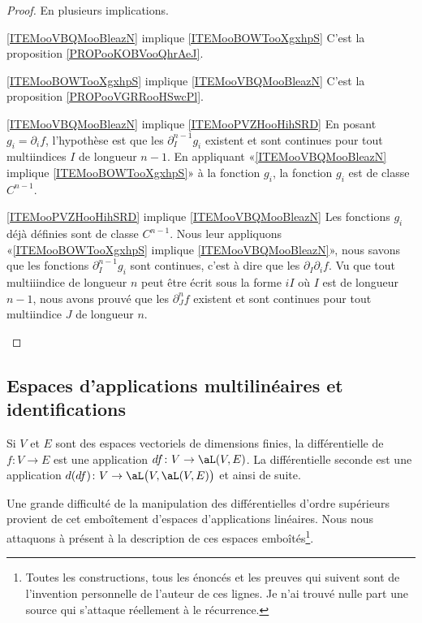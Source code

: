 \begin{proof}
    En plusieurs implications.
    \begin{subproof}
        \item[\ref{ITEMooVBQMooBleazN} implique \ref{ITEMooBOWTooXgxhpS}]
            C'est la proposition \ref{PROPooKOBVooQhrAeJ}.
        \item[\ref{ITEMooBOWTooXgxhpS} implique \ref{ITEMooVBQMooBleazN}]
            C'est la proposition \ref{PROPooVGRRooHSwcPl}.
        \item[\ref{ITEMooVBQMooBleazN} implique \ref{ITEMooPVZHooHihSRD}]
            En posant \( g_i=\partial_if\), l'hypothèse est que les \( \partial^{n-1}_Ig_i\) existent et sont continues pour tout multiindices \( I\) de longueur \( n-1\). En appliquant «\ref{ITEMooVBQMooBleazN} implique \ref{ITEMooBOWTooXgxhpS}» à la fonction \( g_i\), la fonction \( g_i\) est de classe \( C^{n-1}\).
        \item[\ref{ITEMooPVZHooHihSRD} implique \ref{ITEMooVBQMooBleazN}]
            Les fonctions \( g_i\) déjà définies sont de classe \( C^{n-1}\). Nous leur appliquons «\ref{ITEMooBOWTooXgxhpS} implique \ref{ITEMooVBQMooBleazN}», nous savons que les fonctions \( \partial^{n-1}_Ig_i\) sont continues, c'est à dire que les \( \partial_I\partial_if\). Vu que tout multiiindice de longueur \( n\) peut être écrit sous la forme \( iI\) où \( I\) est de longueur \( n-1\), nous avons prouvé que les \( \partial^n_Jf\) existent et sont continues pour tout multiindice \( J\) de longueur \( n\).
    \end{subproof}
\end{proof}

\subsection{Espaces d'applications multilinéaires et identifications}

Si \( V\) et \( E\) sont des espaces vectoriels de dimensions finies, la différentielle de \( f\colon V\to E\) est une application \( df\colon V\to \aL(V,E)\). La différentielle seconde est une application \( d(df)\colon V\to \aL\big( V,\aL(V,E) \big)\) et ainsi de suite.

Une grande difficulté de la manipulation des différentielles d'ordre supérieurs provient de cet emboîtement d'espaces d'applications linéaires. Nous nous attaquons à présent à la description de ces espaces emboîtés\footnote{Toutes les constructions, tous les énoncés et les preuves qui suivent sont de l'invention personnelle de l'auteur de ces lignes. Je n'ai trouvé nulle part une source qui s'attaque réellement à le récurrence.}.

